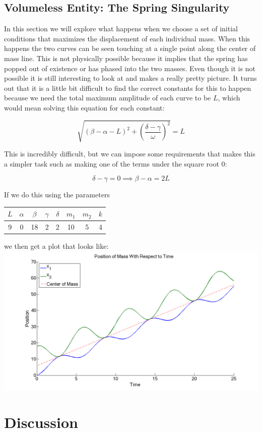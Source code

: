 \documentclass[11pt, oneside]{article}   	%
\begin{document}
\subsection{Volumeless Entity: The Spring Singularity}
In this section we will explore what happens when we choose a set of initial conditions that maximizes the displacement of each individual mass. When this happens the two curves can be seen touching at a single point along the center of mass line. This is not physically possible because it implies that the spring has popped out of existence or has phased into the two masses. Even though it is not possible it is still interesting to look at and makes a really pretty picture. It turns out that it is a little bit difficult to find the correct constants for this to happen because we need the total maximum amplitude of each curve to be $L$, which would mean solving this equation for each constant:

$$\sqrt{(\beta - \alpha -L)^2 + \left(\frac{\delta - \gamma}{\omega}\right)^2}=L$$

This is incredibly difficult, but we can impose some requirements that makes this a simpler task such as making one of the terms under the square root $0$:

$$\delta - \gamma = 0 \implies \beta - \alpha = 2L$$

If we do this using the parameters

\begin{center}

\begin{tabular}{| c | c | c | c | c | c | c | c |}

\hline

$L$ & $\alpha$ & $\beta$ & $\gamma$ & $\delta$ & $m_1$ & $m_2$ & $k$ \\

\hline

 9 & 0 & 18 & 2 & 2 & 10 & 5 & 4\\

\hline

\end{tabular}

\end{center}

we then get a plot that looks like: \\

\includegraphics[scale=0.3]{spring_sing}


\section{Discussion}
\end{document}
